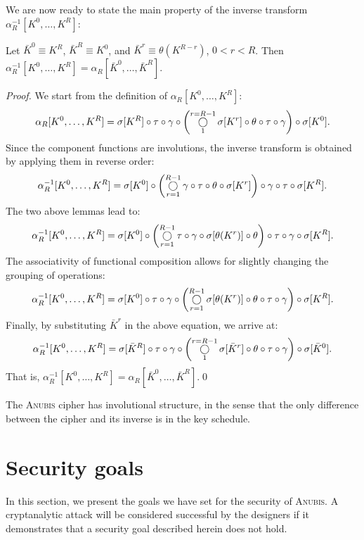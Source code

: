 \documentclass{llncs}
\newcommand{\compository}{\mathop{\bigcirc}\displaylimits}
\begin{document}
We are now ready to state the main property of the inverse
transform $\alpha^{-1}_R[K^0, \dots, K^R]$:

\begin{theorem}
Let $\bar{K}^0 \equiv K^R$, $\bar{K}^R \equiv K^0$, and
$\bar{K}^r \equiv \theta(K^{R-r})$, $0 < r < R$. Then
$\alpha^{-1}_R[K^0, \dots, K^R] = \alpha_R[\bar{K}^0, \dots,
\bar{K}^R]$.
\end{theorem}
\begin{proof}
We start from the definition of $\alpha_R[K^0, \dots, K^R]$:
\[
\alpha_R[K^0, \dots, K^R] = \sigma[K^R] \circ \tau \circ \gamma
\circ \left(\compository^{r=R-1}_1{\sigma[K^r] \circ \theta \circ
\tau \circ \gamma}\right) \circ \sigma[K^0].
\]
Since the component functions are involutions, the inverse
transform is obtained by applying them in reverse order:
\[
\alpha^{-1}_R[K^0, \dots, K^R] = \sigma[K^0] \circ
\left(\compository_{r=1}^{R-1}{\gamma \circ \tau \circ \theta
\circ \sigma[K^r]}\right) \circ \gamma \circ \tau \circ
\sigma[K^R].
\]
The two above lemmas lead to:
\[
\alpha^{-1}_R[K^0, \dots, K^R] = \sigma[K^0] \circ
\left(\compository_{r=1}^{R-1}{\tau \circ \gamma \circ
\sigma[\theta(K^r)] \circ \theta}\right) \circ \tau \circ \gamma
\circ \sigma[K^R].
\]
The associativity of functional composition allows for slightly
changing the grouping of operations:
\[
\alpha^{-1}_R[K^0, \dots, K^R] = \sigma[K^0] \circ \tau \circ
\gamma \circ \left(\compository_{r=1}^{R-1}{\sigma[\theta(K^r)]
\circ \theta \circ \tau \circ \gamma}\right) \circ \sigma[K^R].
\]
Finally, by substituting $\bar{K}^r$ in the above equation, we
arrive at:
\[
\alpha^{-1}_R[K^0, \dots, K^R] = \sigma[\bar{K}^R] \circ \tau
\circ \gamma \circ \left(\compository^{r=R-1}_1{\sigma[\bar{K}^r]
\circ \theta \circ \tau \circ \gamma}\right) \circ
\sigma[\bar{K}^0].
\]
That is, $\alpha^{-1}_R[K^0, \dots, K^R] = \alpha_R[\bar{K}^0,
\dots, \bar{K}^R]$.\qed
\end{proof}

\begin{corollary}
The \textsc{Anubis} cipher has involutional structure, in the sense
that the only difference between the cipher and its inverse is in
the key schedule.
\end{corollary}

\section{Security goals}\label{sec-goals}

In this section, we present the goals we have set for the
security of \textsc{Anubis}. A cryptanalytic attack will be
considered successful by the designers if it demonstrates that a
security goal described herein does not hold.
\end{document}
